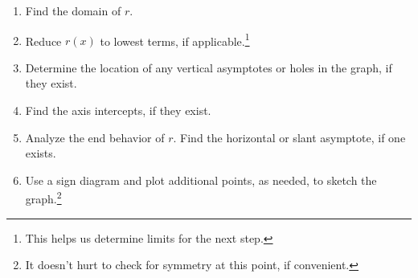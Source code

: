 \documentclass{ximera}
\begin{document}
\begin{enumerate}

\item  Find the domain of $r$.

\item  Reduce $r(x)$ to lowest terms, if applicable.\footnote{This helps us determine limits for the next step.}

\item  Determine the location of any vertical asymptotes or holes in the graph, if they exist. 

\item  Find the axis intercepts, if they exist.

\item  Analyze the end behavior of $r$.  Find the horizontal or slant asymptote, if one exists.

\item  Use a sign diagram and plot additional points, as needed, to sketch the graph.\footnote{It doesn't hurt to check for symmetry at this point, if convenient.}

\end{enumerate}


\bigskip
\end{document}
